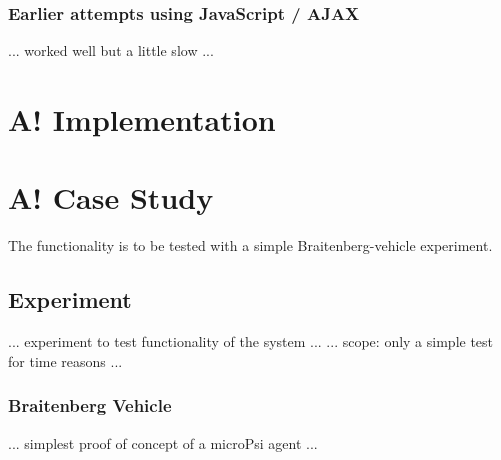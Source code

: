 \subsubsection{Earlier attempts using JavaScript / AJAX}
... worked well but a little slow ...

\section{A! Implementation}

\section{A! Case Study}

The functionality is to be tested with a simple Braitenberg-vehicle experiment.

\subsection{Experiment}
... experiment to test functionality of the system ...
... scope: only a simple test for time reasons ...

\subsubsection{Braitenberg Vehicle}
... simplest proof of concept of a microPsi agent ...
